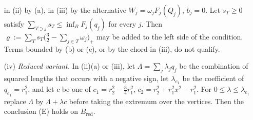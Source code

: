 \begin{lemma}
\begin{enumerate}
in \textup{(ii)} by \textup{(a)}, in \textup{(iii)} by the alternative $W_j=\omega_jF_j(Q_j)$, $b_j=0$. Let $s_T\ge0$ satisfy
$\sum_{T\ni j}s_T\le\inf_BF_j(q_j)$ for every $j$. Then $\varrho:=\sum_Ts_T\bigl(\tfrac32-\sum_{j\in T}\omega_j\bigr)_+$ may be added to the
left side of the condition. Terms bounded by \textup{(b)} or \textup{(c)}, or by the chord in \textup{(iii)}, do not qualify.
\item[\textup{(iv)}] \emph{Reduced variant.} In \textup{(ii)(a)} or \textup{(iii)}, let $\Lambda=\sum_j\lambda_jq_j$ be the combination
of squared lengths that occurs with a negative sign, let $\lambda_{e_1}$ be the coefficient of $q_{e_1}=r_1^2$, and let $c$ be one of
$c_1=r_2^2-\frac34r_1^2$, $c_2=r_2^2+r_1^2x^2-r_1^2$. For $0\le\lambda\le\lambda_{e_1}$ replace $\Lambda$ by $\Lambda+\lambda c$
before taking the extremum over the vertices. Then the conclusion \textup{(E)} holds on $B_{\mathrm{red}}$.
\end{enumerate}
\end{lemma}

